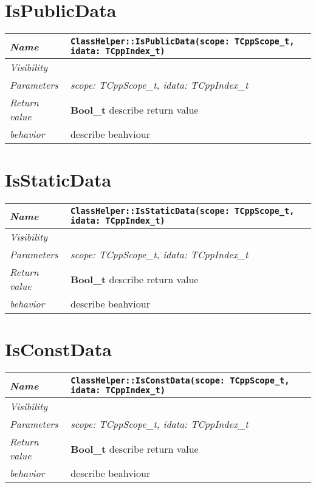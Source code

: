  \section{IsPublicData}
\begin{longtable}{p{3cm} @{\hskip 1cm} p{12cm}}
 \hline
\textit{Name} & \texttt{ClassHelper::IsPublicData(scope: TCppScope_t, idata: TCppIndex_t)}\\
\hline
 \textit{Visibility} & \\
\hline
\textit{Parameters} & \textit{scope: TCppScope_t, idata: TCppIndex_t}\\
\hline
\textit{Return value} & \textbf{ Bool_t} describe return value\\
  \hline
 \textit{behavior} & describe beahviour \\
\hline
\end{longtable} \pagebreak
 \section{IsStaticData}
\begin{longtable}{p{3cm} @{\hskip 1cm} p{12cm}}
 \hline
\textit{Name} & \texttt{ClassHelper::IsStaticData(scope: TCppScope_t, idata: TCppIndex_t)}\\
\hline
 \textit{Visibility} & \\
\hline
\textit{Parameters} & \textit{scope: TCppScope_t, idata: TCppIndex_t}\\
\hline
\textit{Return value} & \textbf{ Bool_t} describe return value\\
  \hline
 \textit{behavior} & describe beahviour \\
\hline
\end{longtable} \pagebreak
 \section{IsConstData}
\begin{longtable}{p{3cm} @{\hskip 1cm} p{12cm}}
 \hline
\textit{Name} & \texttt{ClassHelper::IsConstData(scope: TCppScope_t, idata: TCppIndex_t)}\\
\hline
 \textit{Visibility} & \\
\hline
\textit{Parameters} & \textit{scope: TCppScope_t, idata: TCppIndex_t}\\
\hline
\textit{Return value} & \textbf{ Bool_t} describe return value\\
  \hline
 \textit{behavior} & describe beahviour \\
\hline
\end{longtable} \pagebreak
